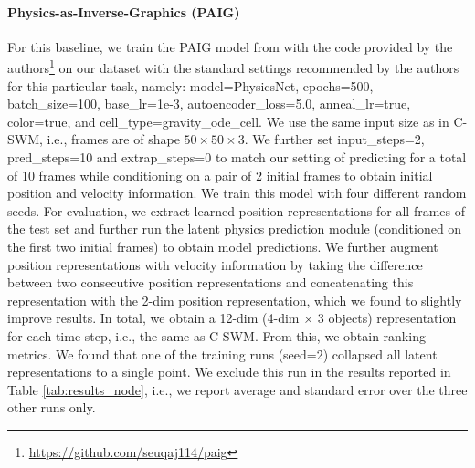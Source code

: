 \documentclass{article} %
\begin{document}
\paragraph{Physics-as-Inverse-Graphics (PAIG)}
For this baseline, we train the PAIG model from \citet{jaques2019physics} with the code provided by the authors\footnote{\url{https://github.com/seuqaj114/paig}} on our dataset with the standard settings recommended by the authors for this particular task, namely: model=PhysicsNet, epochs=500, batch\_size=100, base\_lr=1e-3, autoencoder\_loss=5.0, anneal\_lr=true, color=true, and cell\_type=gravity\_ode\_cell. We use the same input size as in C-SWM, i.e., frames are of shape $50\times50\times3$. We further set input\_steps=2, pred\_steps=10 and extrap\_steps=0 to match our setting of predicting for a total of 10 frames while conditioning on a pair of 2 initial frames to obtain initial position and velocity information. We train this model with four different random seeds. For evaluation, we extract learned position representations for all frames of the test set and further run the latent physics prediction module (conditioned on the first two initial frames) to obtain model predictions. We further augment position representations with velocity information by taking the difference between two consecutive position representations and concatenating this representation with the 2-dim position representation, which we found to slightly improve results. In total, we obtain a 12-dim (4-dim $\times$ 3 objects) representation for each time step, i.e., the same as C-SWM. From this, we obtain ranking metrics. We found that one of the training runs (seed=2) collapsed all latent representations to a single point. We exclude this run in the results reported in Table \ref{tab:results_node}, i.e., we report average and standard error over the three other runs only.
\end{document}

